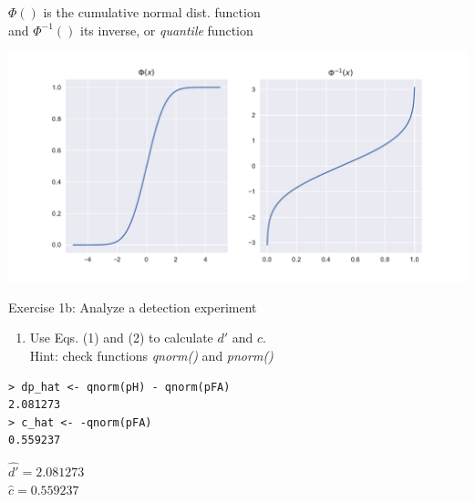 \documentclass[10pt]{beamer}
\begin{document}
\begin{frame}{}
$\Phi()$ is the cumulative normal dist. function\\
and $\Phi^{-1}()$ its inverse, or \textit{quantile} function


\begin{center}
\includegraphics[scale=0.5]{figs/linkfun.pdf}
\end{center}
\end{frame}

\begin{frame}[fragile]{Exercise 1b: Analyze a detection experiment}
\begin{enumerate}
\item Use Eqs. (1) and (2) to calculate $d'$ and $c$. \\
Hint: check functions \textit{qnorm()} and \textit{pnorm()}
\end{enumerate}

\pause
\begin{verbatim}
> dp_hat <- qnorm(pH) - qnorm(pFA)
2.081273
> c_hat <- -qnorm(pFA)
0.559237
\end{verbatim}

\begin{center}
$\hat{d'} = 2.081273$\\
$\hat{c} = 0.559237$
\end{center}

\end{frame}
\end{document}
